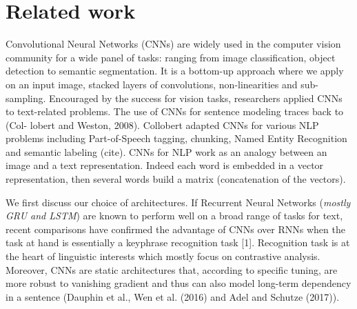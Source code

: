 \section{Related work}

Convolutional Neural Networks (CNNs) are widely used in the computer vision community for a wide panel of tasks: ranging from image classification, 
object detection to semantic segmentation. It is a bottom-up approach where we apply on an input image, stacked layers of convolutions, non-linearities and sub-sampling.
Encouraged by the success for vision tasks, researchers applied CNNs to text-related problems. The use of CNNs for sentence modeling traces back to (Col-
lobert and Weston, 2008). Collobert adapted 
CNNs for various NLP problems including Part-of-Speech tagging, chunking, Named Entity Recognition and semantic labeling (cite). 
CNNs for NLP work as an analogy between an image and a text representation. Indeed each word is embedded in a vector representation, then several words build a matrix (concatenation of the vectors). 


We first discuss our choice of architectures. 
If Recurrent Neural Networks (\textit{mostly GRU and LSTM}) are known to perform well on a broad range of tasks for text, recent comparisons have confirmed the advantage of CNNs 
over RNNs when the task at hand is essentially a keyphrase recognition task [1]. Recognition task is at the heart of linguistic interests which mostly focus on contrastive analysis.
Moreover, CNNs are static architectures that, according to specific tuning, are more robust 
to vanishing gradient and thus can also model long-term dependency in a sentence (Dauphin et al.,  
Wen et al. (2016) and Adel and Schutze (2017)). 

